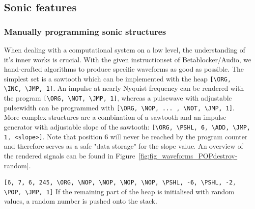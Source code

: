 \documentclass[letterpaper, 12pt]{article}
\begin{document}



\subsection{Sonic features} 
\label{sub:sonic_features}



\subsubsection{Manually programming sonic structures}
\label{sub:manual_programming_sonic_structures}

When dealing with a computational system on a low level, the understanding of it's inner works is crucial.
With the given instructionset of Betablocker/Audio, we hand-crafted algorithms to produce specific waveforms as good as possible.
The simplest set is a sawtooth which can be implemented with the heap \verb#[\ORG, \INC, \JMP, 1]#.
An impulse at nearly Nyquist frequency can be rendered with the program \verb#[\ORG, \NOT, \JMP, 1]#, whereas a pulsewave with adjustable pulsewidth can be programmed with \verb#[\ORG, \NOP, ... , \NOT, \JMP, 1]#.
More complex structures are a combination of a sawtooth and an impulse generator with adjustable slope of the sawtooth: \verb#[\ORG, \PSHL, 6, \ADD, \JMP, 1, <slope>]#. Note that position 6 will never be reached by the program counter and therefore serves as a safe "data storage" for the slope value.
An overview of the rendered signals can be found in Figure~\ref{fig:fig_waveforms_POPdestroy-random}.

\verb#[6, 7, 6, 245, \ORG, \NOP, \NOP, \NOP, \NOP, \PSHL, -6, \PSHL, -2, \POP, \JMP, 1]#
If the remaining part of the heap is initialised with random values, a random number is pushed onto the stack.
\end{document}
